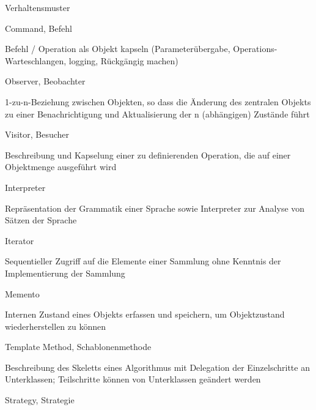 \documentclass[a4paper]{article}
\begin{document}
\begin{multicols}{3}
  Verhaltensmuster
  \begin{itemize*}
    \item Command, Befehl
    \begin{itemize*}
      \item Befehl / Operation als Objekt kapseln (Parameterübergabe, Operations-Warteschlangen, logging, Rückgängig machen)
    \end{itemize*}
    \item Observer, Beobachter
    \begin{itemize*}
      \item 1-zu-n-Beziehung zwischen Objekten, so dass die Änderung des zentralen Objekts zu einer Benachrichtigung und Aktualisierung der n (abhängigen) Zustände führt
    \end{itemize*}
    \item Visitor, Besucher
    \begin{itemize*}
      \item Beschreibung und Kapselung einer zu definierenden Operation, die auf einer Objektmenge ausgeführt wird
    \end{itemize*}
    \item Interpreter
    \begin{itemize*}
      \item Repräsentation der Grammatik einer Sprache sowie Interpreter zur Analyse von Sätzen der Sprache
    \end{itemize*}
    \item Iterator
    \begin{itemize*}
      \item Sequentieller Zugriff auf die Elemente einer Sammlung ohne Kenntnis der Implementierung der Sammlung
    \end{itemize*}
    \item Memento
    \begin{itemize*}
      \item Internen Zustand eines Objekts erfassen und speichern, um Objektzustand wiederherstellen zu können
    \end{itemize*}
    \item Template Method, Schablonenmethode
    \begin{itemize*}
      \item Beschreibung des Skeletts eines Algorithmus mit Delegation der Einzelschritte an Unterklassen; Teilschritte können von Unterklassen geändert werden
    \end{itemize*}
    \item Strategy, Strategie

\end{itemize*}
\end{multicols}
\end{document}
